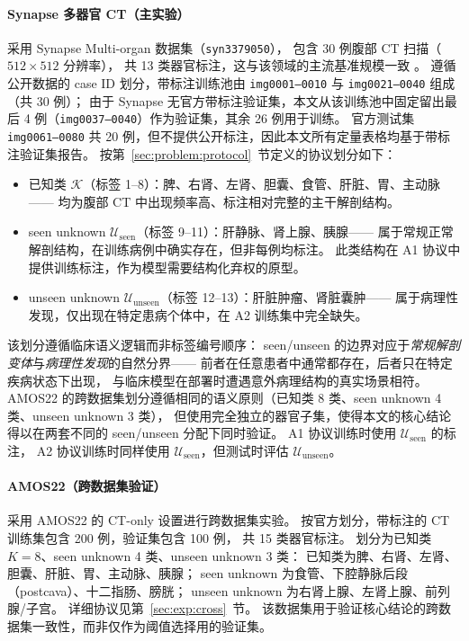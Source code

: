 \documentclass[3p,twocolumn,authoryear]{elsarticle}
\newcommand{\cK}{\mathcal{K}}                             %
\newcommand{\cU}{\mathcal{U}}                             %
\begin{document}
\paragraph{Synapse 多器官 CT（主实验）}
采用 Synapse Multi-organ 数据集（\texttt{syn3379050}），
包含 30 例腹部 CT 扫描（$512 \times 512$ 分辨率），
共 13 类器官标注，这与该领域的主流基准规模一致
\cite{chen2021transunet,cao2022swinunet}。
遵循公开数据的 case ID 划分，带标注训练池由 \texttt{img0001--0010} 与 \texttt{img0021--0040} 组成（共 30 例）；
由于 Synapse 无官方带标注验证集，本文从该训练池中固定留出最后 4 例（\texttt{img0037--0040}）作为验证集，其余 26 例用于训练。
官方测试集 \texttt{img0061--0080} 共 20 例，但不提供公开标注，因此本文所有定量表格均基于带标注验证集报告。
按第~\ref{sec:problem:protocol}~节定义的协议划分如下：
\begin{itemize}[nosep]
  \item 已知类 $\cK$（标签 1--8）：脾、右肾、左肾、胆囊、食管、肝脏、胃、主动脉——
        均为腹部 CT 中出现频率高、标注相对完整的主干解剖结构。
  \item seen unknown $\cU_{\text{seen}}$（标签 9--11）：肝静脉、肾上腺、胰腺——
        属于常规正常解剖结构，在训练病例中确实存在，但非每例均标注。
        此类结构在 A1 协议中提供训练标注，作为模型需要结构化弃权的原型。
  \item unseen unknown $\cU_{\text{unseen}}$（标签 12--13）：肝脏肿瘤、肾脏囊肿——
        属于病理性发现，仅出现在特定患病个体中，在 A2 训练集中完全缺失。
\end{itemize}
该划分遵循临床语义逻辑而非标签编号顺序：
seen/unseen 的边界对应于\emph{常规解剖变体}与\emph{病理性发现}的自然分界——
前者在任意患者中通常都存在，后者只在特定疾病状态下出现，
与临床模型在部署时遭遇意外病理结构的真实场景相符。
AMOS22 的跨数据集划分遵循相同的语义原则（已知类 8 类、seen unknown 4 类、unseen unknown 3 类），
但使用完全独立的器官子集，使得本文的核心结论得以在两套不同的 seen/unseen 分配下同时验证。
A1 协议训练时使用 $\cU_{\text{seen}}$ 的标注，
A2 协议训练时同样使用 $\cU_{\text{seen}}$，但测试时评估 $\cU_{\text{unseen}}$。

\paragraph{AMOS22（跨数据集验证）}
采用 AMOS22 的 CT-only 设置进行跨数据集实验。
按官方划分，带标注的 CT 训练集包含 200 例，验证集包含 100 例，
共 15 类器官标注。
划分为已知类 $K=8$、seen unknown 4 类、unseen unknown 3 类：
已知类为脾、右肾、左肾、胆囊、肝脏、胃、主动脉、胰腺；
seen unknown 为食管、下腔静脉后段（postcava）、十二指肠、膀胱；
unseen unknown 为右肾上腺、左肾上腺、前列腺/子宫。
详细协议见第~\ref{sec:exp:cross}~节。
该数据集用于验证核心结论的跨数据集一致性，而非仅作为阈值选择用的验证集。
\end{document}

